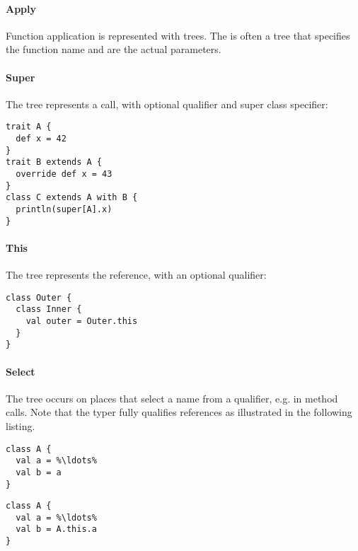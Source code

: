 \paragraph{Apply} 

\noindent Function application is represented with  trees. The  is often a  tree that specifies the function name and  are the actual parameters.

\paragraph{Super} 

\noindent The  tree represents a  call, with optional qualifier and super class specifier:

\begin{lstlisting}
trait A {
  def x = 42
}
trait B extends A {
  override def x = 43
}
class C extends A with B {
  println(super[A].x)
}
\end{lstlisting}

\paragraph{This} 

\noindent The  tree represents the  reference, with an optional qualifier:

\begin{lstlisting}
class Outer {
  class Inner {
    val outer = Outer.this
  }
}
\end{lstlisting}

\paragraph{Select} 

\noindent The  tree occurs on places that select a name from a qualifier, e.g. in method calls. Note that the typer fully qualifies references as illustrated in the following listing.

\begin{multicols}{2}
\begin{lstlisting}
class A {
  val a = %\ldots%
  val b = a
}
\end{lstlisting}
\begin{lstlisting}  
class A {
  val a = %\ldots%
  val b = A.this.a
}
\end{lstlisting}
\end{multicols}

